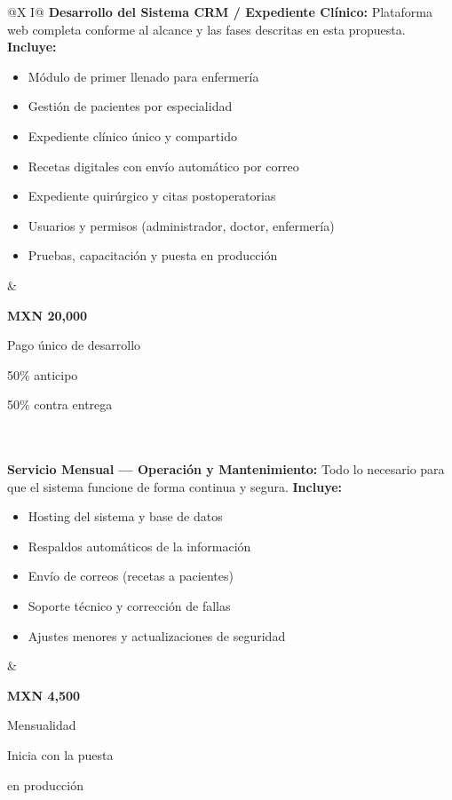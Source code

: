 \documentclass[11pt,letterpaper]{article}
\newcommand{\precioBox}[2]{%
    {\Large\bfseries\color{azulcom}MXN #1}\par\vspace{2pt}%
    {\footnotesize\color{gristexto}#2}\par%
}
\begin{document}
\noindent
\begin{tabularx}{\linewidth}{@{}X I@{}}
\textbf{Desarrollo del Sistema CRM / Expediente Clínico:} Plataforma web completa conforme al alcance y las fases descritas en esta propuesta.\newline\newline
\textbf{Incluye:}
\begin{itemize}[leftmargin=14pt, itemsep=2pt, topsep=2pt]
    \item Módulo de primer llenado para enfermería
    \item Gestión de pacientes por especialidad
    \item Expediente clínico único y compartido
    \item Recetas digitales con envío automático por correo
    \item Expediente quirúrgico y citas postoperatorias
    \item Usuarios y permisos (administrador, doctor, enfermería)
    \item Pruebas, capacitación y puesta en producción
\end{itemize}
&
\begin{minipage}[t]{4.2cm}
\centering
\precioBox{20,000}{Pago único de desarrollo}
\vspace{8pt}\par
{\footnotesize\color{gristexto}50\% anticipo\par 50\% contra entrega}
\end{minipage}
\\[6pt]
\hline
\\[-6pt]
\textbf{Servicio Mensual --- Operación y Mantenimiento:} Todo lo necesario para que el sistema funcione de forma continua y segura.\newline\newline
\textbf{Incluye:}
\begin{itemize}[leftmargin=14pt, itemsep=2pt, topsep=2pt]
    \item Hosting del sistema y base de datos
    \item Respaldos automáticos de la información
    \item Envío de correos (recetas a pacientes)
    \item Soporte técnico y corrección de fallas
    \item Ajustes menores y actualizaciones de seguridad
\end{itemize}
&
\begin{minipage}[t]{4.2cm}
\centering
\precioBox{4,500}{Mensualidad}
\vspace{8pt}\par
{\footnotesize\color{gristexto}Inicia con la puesta\par en producción}
\end{minipage}
\end{tabularx}
\end{document}
